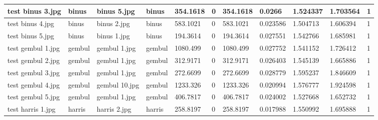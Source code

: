 \begin{landscape}
\begin{longtable}{|p{2cm}|p{1.5cm}|p{2cm}|p{1.5cm}|p{2cm}|p{1cm}|p{2cm}|p{2cm}|p{2cm}|p{2cm}|p{1cm}|}
		test binus 3.jpg     & binus            & binus 5.jpg           & binus                       & 354.1618              & 0                       & 354.1618                   & 0.0266                & 1.524337              & 1.703564                 & 1                \\ \hline
		test binus 4.jpg     & binus            & binus 2.jpg           & binus                       & 583.1021              & 0                       & 583.1021                   & 0.023586              & 1.504713              & 1.606394                 & 1                \\ \hline
		test binus 5.jpg     & binus            & binus 1.jpg           & binus                       & 194.3614              & 0                       & 194.3614                   & 0.027551              & 1.542766              & 1.685981                 & 1                \\ \hline
		test gembul 1.jpg    & gembul           & gembul 1.jpg          & gembul                      & 1080.499              & 0                       & 1080.499                   & 0.027752              & 1.541152              & 1.726412                 & 1                \\ \hline
		test gembul 2.jpg    & gembul           & gembul 1.jpg          & gembul                      & 312.9171              & 0                       & 312.9171                   & 0.026403              & 1.545139              & 1.665886                 & 1                \\ \hline
		test gembul 3.jpg    & gembul           & gembul 1.jpg          & gembul                      & 272.6699              & 0                       & 272.6699                   & 0.028779              & 1.595237              & 1.846609                 & 1                \\ \hline
		test gembul 4.jpg    & gembul           & gembul 10.jpg         & gembul                      & 1233.326              & 0                       & 1233.326                   & 0.020994              & 1.576777              & 1.924598                 & 1                \\ \hline
		test gembul 5.jpg    & gembul           & gembul 1.jpg          & gembul                      & 406.7817              & 0                       & 406.7817                   & 0.024002              & 1.527668              & 1.652732                 & 1                \\ \hline
		test harris 1.jpg    & harris           & harris 2.jpg          & harris                      & 258.8197              & 0                       & 258.8197                   & 0.017988              & 1.550992              & 1.695888                 & 1                \\ \hline

\end{longtable}
\end{landscape}
